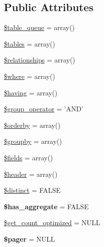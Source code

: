 \subsection*{Public Attributes}
\begin{DoxyCompactItemize}
\item 
\hyperlink{classviews__plugin__query__default_a8b9c8d35f8f58604b6ba179df43901ce}{\$table\_\-queue} = array()
\item 
\hyperlink{classviews__plugin__query__default_a11b47da6c7d595ee69d8b9a7e2dffcb2}{\$tables} = array()
\item 
\hyperlink{classviews__plugin__query__default_a80a77249462e17b745fa167f9fca5177}{\$relationships} = array()
\item 
\hyperlink{classviews__plugin__query__default_a3b78c1aebd049aedc5adc16f545aaa4a}{\$where} = array()
\item 
\hyperlink{classviews__plugin__query__default_a93e745553fd52e27f1f8a452ac488386}{\$having} = array()
\item 
\hyperlink{classviews__plugin__query__default_ab3ae3b818b07e6bcb4e28b341fb33ae4}{\$group\_\-operator} = 'AND'
\item 
\hyperlink{classviews__plugin__query__default_a6f6e7838215c13cab0a81089370a912c}{\$orderby} = array()
\item 
\hyperlink{classviews__plugin__query__default_a0a7d6a19164e163f2aa6d7ada81f1e89}{\$groupby} = array()
\item 
\hyperlink{classviews__plugin__query__default_afa5f8f33e73ba1f4da8cab4024a70023}{\$fields} = array()
\item 
\hyperlink{classviews__plugin__query__default_ac3fc642ec03905693aefc021f5550052}{\$header} = array()
\item 
\hyperlink{classviews__plugin__query__default_a37f3813ca0186cc80579e617ba612b49}{\$distinct} = FALSE
\item 
\hypertarget{classviews__plugin__query__default_a25ebd9635dc2afd0e29558900b0b6d63}{
{\bfseries \$has\_\-aggregate} = FALSE}
\label{classviews__plugin__query__default_a25ebd9635dc2afd0e29558900b0b6d63}

\item 
\hyperlink{classviews__plugin__query__default_a2744778e8e8b20a19fcbcfebd0dd1388}{\$get\_\-count\_\-optimized} = NULL
\item 
\hypertarget{classviews__plugin__query__default_aa290a036dfc0e954b5b73b5b337f9ec3}{
{\bfseries \$pager} = NULL}
\label{classviews__plugin__query__default_aa290a036dfc0e954b5b73b5b337f9ec3}


\end{DoxyCompactItemize}
